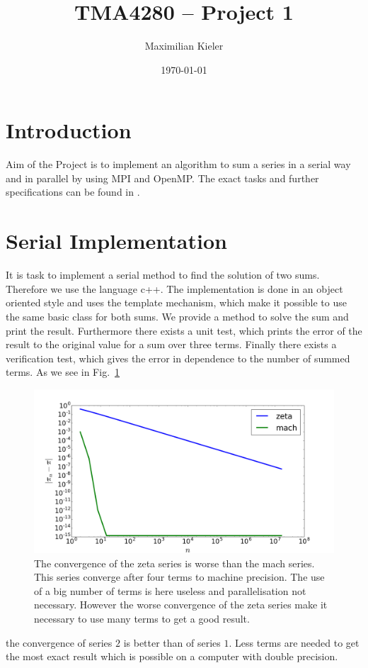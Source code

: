 







\title{TMA4280 -- Project 1}
\author{Maximilian Kieler}
\date{\today}

\maketitle


\section{Introduction}

Aim of the Project is to implement an algorithm to sum a series in a serial way and in parallel by using MPI and OpenMP. The exact tasks and further specifications can be found in \cite{}. 




\section{Serial Implementation}

It is task to implement a serial method to find the solution of two sums. Therefore we use the language c++. The implementation is done in an object oriented style and uses the template mechanism, which make it possible to use the same basic class for both sums. We provide a method to solve the sum and print the result. Furthermore there exists a unit test, which prints the error of the result to the original value for a sum over three terms. Finally there exists a verification test, which gives the error in dependence to the number of summed terms. As we see in Fig.~\ref{fig:convergence_series}\begin{figure}[h] 
  \centering
     \includegraphics[width=\textwidth]{pic/convergence_series.png}
  \caption{The convergence of the zeta series is worse than the mach series. This series converge after four terms to machine precision. The use of a big number of terms is here useless and parallelisation not necessary. However the worse convergence of the zeta series make it necessary to use many terms to get a good result.}
  \label{fig:convergence_series}
\end{figure} the convergence of series $2$ is better than of series $1$. Less terms are needed to get the most exact result which is possible on a computer with double precision. 






